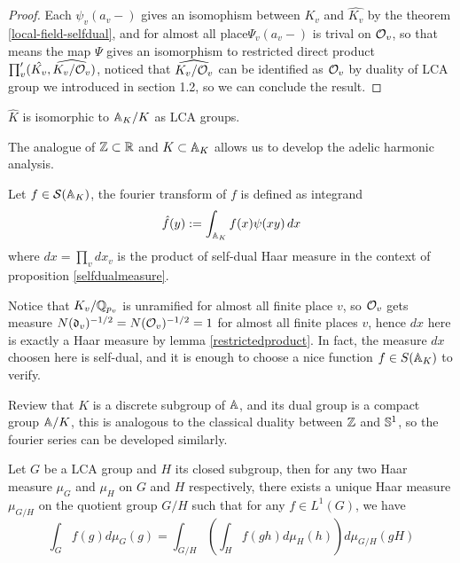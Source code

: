 \begin{proof}
    Each \(\psi_v(a_v-)\) gives an isomophism between \(K_v\) and \(\hat{K_v}\) by the theorem \ref{local-field-selfdual}, and for almost all place\(\Psi_v(a_v -)\) is trival on \(\mathcal{O}_v\), so that means the map \(\Psi\) gives an isomorphism to restricted direct product \(\prod_{v}^{\prime}(\hat{K_v},\widehat{K_v/\mathcal{O}_v})\), noticed that \(\widehat{K_v/\mathcal{O}_v}\) can be identified as \(\mathcal{O}_v\) by duality of LCA group we introduced in section 1.2, so we can conclude the result.
\end{proof}

\begin{corollary}
    \(\hat{K}\) is isomorphic to \(\mathbb{A}_K/K\) as LCA groups.
\end{corollary}

The analogue of \(\mathbb{Z} \subset \mathbb{R}\) and \(K \subset \mathbb{A}_K\) allows us to develop the adelic harmonic analysis.

\begin{definition}
    Let \(f \in \mathcal{S}(\mathbb{A}_K)\), the fourier transform of \(f\) is defined as integrand
    \[\hat{f}(y) := \int_{\mathbb{A}_K} f(x) \psi(xy) \, dx\]
    where \(dx = \prod_v dx_v\) is the product of self-dual Haar measure in the context of proposition \ref{selfdualmeasure}.
\end{definition}

Notice that \(K_v/\mathbb{Q}_{p_v}\) is unramified for almost all finite place \(v\), so \(\mathcal{O}_v\) gets measure \(N(\mathfrak{d}_v)^{-1/2} = N(\mathcal{O}_v)^{-1/2} = 1\) for almost all finite places \(v\), hence \(dx\) here is exactly a Haar measure by lemma \ref{restrictedproduct}. In fact, the measure \(dx\) choosen here is self-dual, and it is enough to choose a nice function \(f \in S(\mathbb{A}_K)\) to verify.

Review that \(K\) is a discrete subgroup of \(\mathbb{A}\), and its dual group is a compact group \(\mathbb{A}/K\), this is analogous to the classical duality between \(\mathbb{Z}\) and \(\mathbb{S}^1\), so the fourier series can be developed similarly. 

\begin{theorem} \label{quotient-integral-formula}
    Let \(G\) be a LCA group and \(H\) its closed subgroup, then for any two Haar measure \(\mu_G\) and \(\mu_H\) on \(G\) and \(H\) respectively, there exists a unique Haar measure \(\mu_{G/H}\) on the quotient group \(G/H\) such that for any \(f \in L^1(G)\), we have 
    \[\int_G f(g) d\mu_G(g) = \int_{G/H} \left( \int_H f(gh) d\mu_H(h) \right) d\mu_{G/H}(gH) \]
\end{theorem}

